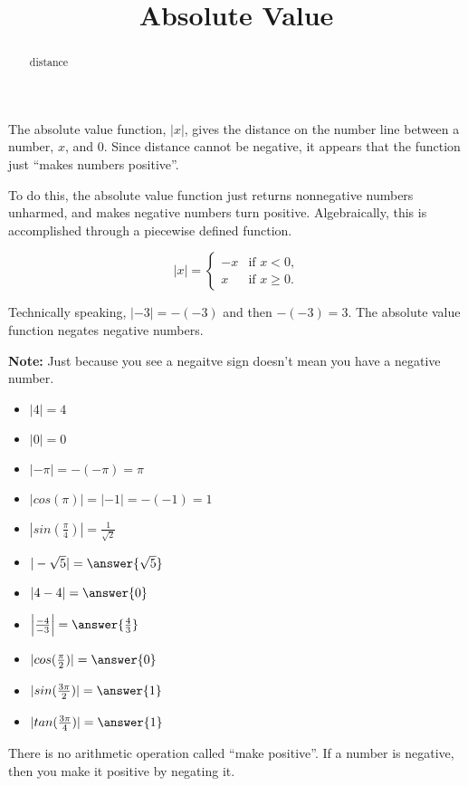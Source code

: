 \documentclass{ximera}
\title{Absolute Value}
\begin{document}
\begin{abstract}
distance
\end{abstract}
\maketitle



The absolute value function, $|x|$, gives the distance on the number line between a number, $x$, and $0$.  Since distance cannot be negative, it appears that the function just ``makes numbers positive''.


To do this, the absolute value function just returns nonnegative numbers unharmed, and makes negative numbers turn positive.  Algebraically, this is accomplished through a piecewise defined function.






\[
|x| = 
\begin{cases}
  -x &\text{if $x<0$,}\\
  x & \text{if $x\ge 0$}.
\end{cases}
\]


Technically speaking, $|-3| = -(-3)$ and then $-(-3) = 3$.  The absolute value function negates negative numbers.


\textbf{Note:} Just because you see a negaitve sign doesn't mean you have a negative number.



\begin{example}
\begin{itemize}
\item $|4| = 4$
\item $|0| = 0$
\item $|-\pi| = -(-\pi) = \pi$
\item $|cos(\pi)| = |-1| = -(-1) = 1$
\item $|sin(\tfrac{\pi}{4})| = \tfrac{1}{\sqrt{2}}$
\end{itemize}
\end{example}





\begin{example}
\begin{itemize}
\item $|-\sqrt{5}| = \answer{\sqrt{5}}$
\item $|4-4| = \answer{0}$
\item $\left|\frac{-4}{-3}\right| = \answer{\frac{4}{3}}$
\item $|cos(\tfrac{\pi}{2})| = \answer{0}$
\item $|sin(\tfrac{3\pi}{2})| = \answer{1}$
\item $|tan(\tfrac{3\pi}{4})| = \answer{1}$
\end{itemize}
\end{example}
There is no arithmetic operation called ``make positive''.  If a number is negative, then you make it positive by negating it. 
\end{document}
